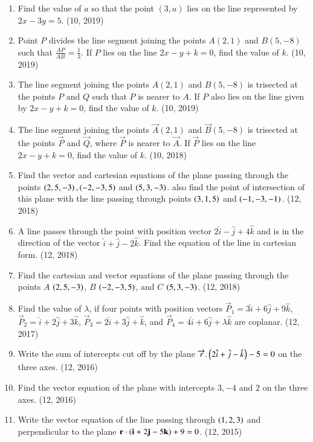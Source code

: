 \begin{enumerate}[label=\thesubsection.\arabic*, ref=\thesubsection.\theenumi]
\item Find the value of $a$ so that the point $(3, a)$ lies on the line represented by $2x - 3y = 5$. \hfill (10, 2019)
\item Point $P$ divides the line segment joining the points $A(2, 1)$ and $B(5, -8)$ such that $\frac{AP}{AB} = \frac{1}{3}$. If $P$ lies on the line $2x - y + k = 0$, find the value of $k$. \hfill (10, 2019)
\item The line segment joining the points $A(2, 1)$ and $B(5, -8)$ is trisected at the points $P$ and $Q$ such that $P$ is nearer to $A$. If $P$ also lies on the line given by $2x - y + k = 0$, find the value of $k$. \hfill (10, 2019)
    \item The line segment joining the points $\vec{A}(2,1)$ and $\vec{B}(5,-8)$ is trisected at the points $\vec{P}$ and $\vec{Q}$, where $\vec{P}$ is nearer to $\vec{A}$. If $\vec{P}$ lies on the line $2x - y + k = 0$, find the value of $k$. \hfill (10, 2018)
\item Find the vector and cartesian equations of the plane passing through the points $\left(2,5,-3\right),\left(-2,-3,5\right)$ and $\left(5,3,-3\right)$. also find the point of intersection of this plane with the line passing through points $\left(3,1,5\right)$ and $\left(-1,-3,-1\right)$.
\hfill (12, 2018)
\item A line passes through the point with position vector $2\hat{i}-\hat{j}+4\hat{k}$ and is in the direction of the vector $\hat{i}+\hat{j}-2\hat{k}$. Find the equation of the line in cartesian form.
\hfill (12, 2018) 
\item Find the cartesian and vector equations of the plane passing through the points $A$ $\left(2, 5, -3\right)$, $B$ $\left(-2, -3, 5\right)$, and $C$ $\left(5, 3, -3\right)$.
\hfill (12, 2018) 
    \item Find the value of $\lambda$, if four points with position vectors $\vec{P}_1 = 3\hat{i} + 6\hat{j} + 9\hat{k}$, $\vec{P}_2 = \hat{i} + 2\hat{j} + 3\hat{k}$, $\vec{P}_3 = 2\hat{i} + 3\hat{j} + \hat{k}$, and $\vec{P}_4 = 4\hat{i} + 6\hat{j} + \lambda\hat{k}$ are coplanar. \hfill (12, 2017)
\item Write the sum of intercepts cut off by the plane $\overrightarrow{r}.\begin{pmatrix}2\hat{i}+\hat{j}-\hat{k}\end{pmatrix} - 5 = 0$ on the three axes. \hfill (12, 2016)
\item Find the vector equation of the plane with intercepts $3,-4$ and $2$ on the three axes. \hfill (12, 2016)
\item Write the vector equation of the line passing through $\left(1,2,3\right)$ and perpendicular to the plane $\mathbf{r}\cdot\left(\mathbf{i}+2\mathbf{j}-5\mathbf{k}\right)+9=0$. \hfill (12, 2015)

\end{enumerate}
